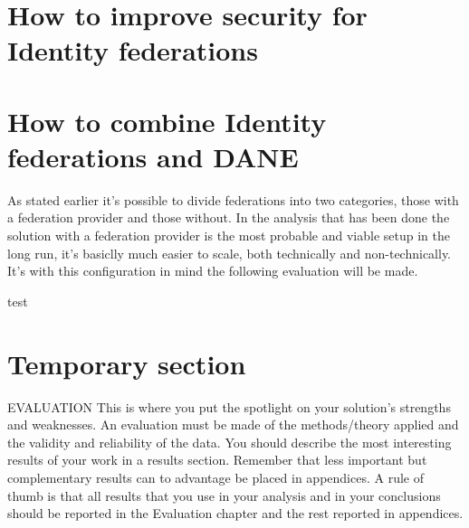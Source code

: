 \section{How to improve security for Identity federations}
\section{How to combine Identity federations and DANE}
As stated earlier it's possible to divide federations into two categories, those with a federation provider and those without.
In the analysis that has been done the solution with a federation provider is the most probable and viable setup in the long run, it's basiclly much easier to scale, both technically and non-technically.
It's with this configuration in mind the following evaluation will be made.


test

\section{Temporary section}
EVALUATION This is where you put the spotlight on your solution's strengths and
weaknesses. An evaluation must be made of the methods/theory applied and the validity
and reliability of the data. You should describe the most interesting results of your work in a
results section. Remember that less important but complementary results can to advantage
be placed in appendices. A rule of thumb is that all results that you use in your analysis and
in your conclusions should be reported in the Evaluation chapter and the rest reported in
appendices.

